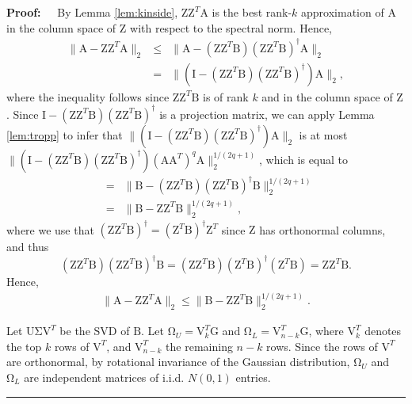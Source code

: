 \documentclass[11pt]{article}
\newenvironment{proof}{\begin{trivlist} \item {\bf Proof:~~}}
  {\qed\end{trivlist}}
\newcommand{\mat}[1]{{\ensuremath{\bm{\mathrm{#1}}}}}
\def\matA{\mat{A}}
\def\matB{\mat{B}}
\def\matG{\mat{G}}
\def\matI{\mat{I}}
\def\matU{\mat{U}}
\def\matV{\mat{V}}
\def\matZ{\mat{Z}}
\def\qed{\hfill\rule{2mm}{2mm}}
\begin{document}
\begin{proof}
By Lemma \ref{lem:kinside}, $\matZ\matZ^T\matA$ is the best rank-$k$ approximation of $\matA$ in the column space of $\matZ$
with respect to the spectral norm. Hence, 
\begin{eqnarray*}
\|\matA - \matZ\matZ^T\matA\|_2 & \leq & \|\matA-(\matZ\matZ^T\matB)(\matZ\matZ^T\matB)^{\dagger}\matA\|_2\\
& = & \|(\matI-(\matZ\matZ^T\matB)(\matZ\matZ^T\matB)^{\dagger})\matA\|_2,
\end{eqnarray*}
where the inequality follows since $\matZ\matZ^T\matB$ is of rank $k$ and in the column space of $\matZ$. Since
$\matI-(\matZ\matZ^T\matB)(\matZ\matZ^T\matB)^{\dagger}$ is a projection matrix, we can apply Lemma \ref{lem:tropp} to infer that $\|(\matI - (\matZ\matZ^T\matB)(\matZ\matZ^T\matB)^{\dagger})\matA\|_2$ is at most
 $\|(\matI- (\matZ\matZ^T\matB)(\matZ\matZ^T\matB)^{\dagger})(\matA\matA^T)^q\matA\|_2^{1/(2q+1)}$, which is
equal to
\begin{eqnarray*}
& = & \|\matB - (\matZ\matZ^T\matB)(\matZ\matZ^T\matB)^{\dagger}\matB\|_2^{1/(2q+1)}\\
& = & \|\matB-\matZ\matZ^T\matB\|_2^{1/(2q+1)},
\end{eqnarray*} 
where we use that $(\matZ\matZ^T\matB)^{\dagger} = (\matZ^T \matB)^{\dagger} \matZ^T$ since $\matZ$ has orthonormal columns, and thus
$$(\matZ\matZ^T\matB)(\matZ\matZ^T\matB)^{\dagger}\matB = (\matZ\matZ^T \matB) (\matZ^T \matB)^{\dagger} (\matZ^T \matB) = \matZ\matZ^T \matB.$$
Hence, 
\begin{eqnarray}\label{eqn:abound}
\|\matA-\matZ\matZ^T\matA\|_2 \leq \|\matB-\matZ\matZ^T\matB\|_2^{1/(2q+1)}.
\end{eqnarray}

Let $\matU\mat\Sigma \matV^T$ be the SVD of $\matB$. Let $\mat\Omega_U = \matV_k^T\matG$
and $\mat\Omega_L = \matV_{n-k}^T\matG$, where $\matV_k^T$ denotes the top $k$ rows of $\matV^T$, and $\matV_{n-k}^T$ the remaining
$n-k$ rows. Since the rows of $\matV^T$ are orthonormal, by rotational invariance of the Gaussian distribution,
$\mat\Omega_U$ and $\mat\Omega_L$ are independent matrices of i.i.d. $N(0,1)$ entries. 


\end{proof}
\end{document}
